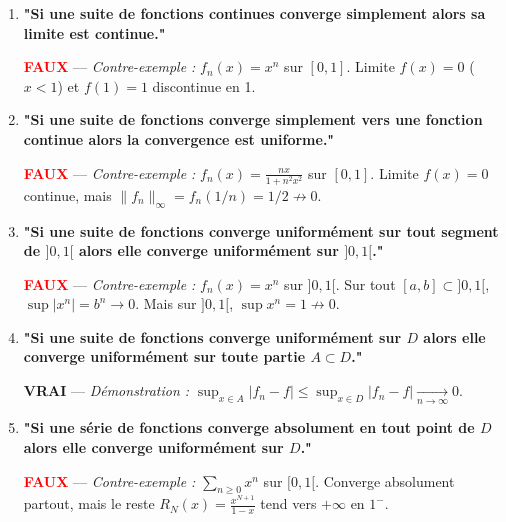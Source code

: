 \documentclass[11pt,a4paper]{article}
\begin{document}
\begin{enumerate}[leftmargin=*]
    \item \textbf{"Si une suite de fonctions continues converge simplement alors sa limite est continue."}
    \begin{center}
    \textbf{\textcolor{red}{FAUX}} --- \textit{Contre-exemple :} $f_n(x) = x^n$ sur $[0, 1]$. Limite $f(x)=0$ ($x < 1$) et $f(1)=1$ discontinue en 1.
    \end{center}

    \item \textbf{"Si une suite de fonctions converge simplement vers une fonction continue alors la convergence est uniforme."}
    \begin{center}
    \textbf{\textcolor{red}{FAUX}} --- \textit{Contre-exemple :} $f_n(x) = \frac{nx}{1+n^2 x^2}$ sur $[0, 1]$. Limite $f(x) = 0$ continue, mais $\|f_n\|_\infty = f_n(1/n) = 1/2 \not\to 0$.
    \end{center}

    \item \textbf{"Si une suite de fonctions converge uniformément sur tout segment de $]0, 1[$ alors elle converge uniformément sur $]0, 1[$."}
    \begin{center}
    \textbf{\textcolor{red}{FAUX}} --- \textit{Contre-exemple :} $f_n(x) = x^n$ sur $]0, 1[$. Sur tout $[a, b] \subset ]0, 1[$, $\sup |x^n| = b^n \to 0$. Mais sur $]0, 1[$, $\sup x^n = 1 \not\to 0$.
    \end{center}

    \item \textbf{"Si une suite de fonctions converge uniformément sur $D$ alors elle converge uniformément sur toute partie $A \subset D$."}
    \begin{center}
    \textbf{\textcolor{blue!80!black}{VRAI}} --- \textit{Démonstration :} $\sup_{x \in A} |f_n - f| \le \sup_{x \in D} |f_n - f| \xrightarrow[n \to \infty]{} 0$.
    \end{center}

    \item \textbf{"Si une série de fonctions converge absolument en tout point de $D$ alors elle converge uniformément sur $D$."}
    \begin{center}
    \textbf{\textcolor{red}{FAUX}} --- \textit{Contre-exemple :} $\sum_{n \ge 0} x^n$ sur $[0, 1[$. Converge absolument partout, mais le reste $R_N(x) = \frac{x^{N+1}}{1-x}$ tend vers $+\infty$ en $1^-$.
    \end{center}


\end{enumerate}
\end{document}
